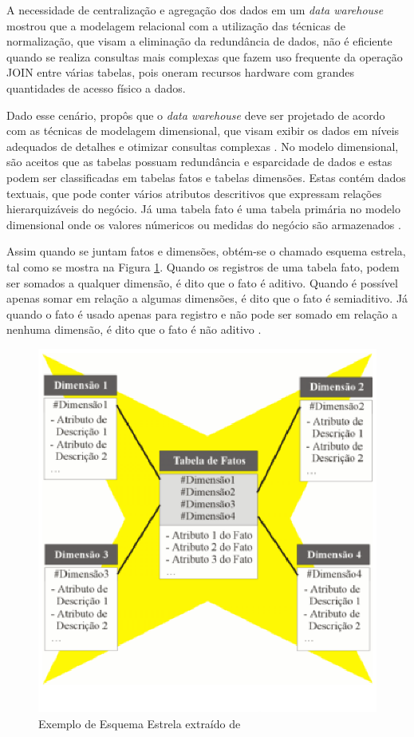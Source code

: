 A necessidade de centralização e agregação dos dados em um \textit{data warehouse} mostrou que a modelagem relacional com a utilização das técnicas de normalização, que visam a eliminação da redundância de dados, não é eficiente quando se realiza consultas mais complexas que fazem uso frequente da operação JOIN entre várias tabelas, pois oneram recursos hardware com grandes quantidades de acesso físico a dados. \cite{Kimball2002}

Dado esse cenário,  propôs que o \textit{data warehouse} deve ser projetado de acordo com as técnicas de modelagem dimensional, que visam exibir os dados em níveis adequados de detalhes e otimizar consultas complexas \cite{valeria2012}. No modelo dimensional, são aceitos que as tabelas possuam redundância e esparcidade de dados e estas podem ser classificadas em tabelas fatos e tabelas dimensões. Estas contém dados textuais, que pode conter vários atributos descritivos que expressam relações hierarquizáveis do negócio. Já uma tabela fato é uma tabela primária no modelo dimensional onde os valores númericos ou medidas do negócio são armazenados \cite{Kimball2002}.


Assim quando se juntam fatos e dimensões, obtém-se o chamado esquema estrela, tal como se mostra na Figura \ref{estrela}. Quando os registros de uma tabela fato, podem ser somados a qualquer dimensão, é dito que o fato é aditivo. Quando é possível apenas somar em relação a algumas dimensões, é dito que o fato é semiaditivo. Já quando o fato é usado apenas para registro e não pode ser somado em relação a nenhuma dimensão, é dito que o fato é não aditivo \cite{Inmon1992}.


\begin{figure}[h!]
\centering
\includegraphics[keepaspectratio=false,scale=1]{figuras/estrela.eps}
\caption{Exemplo de Esquema Estrela extraído de }
\label{estrela}
\end{figure}
\FloatBarrier


